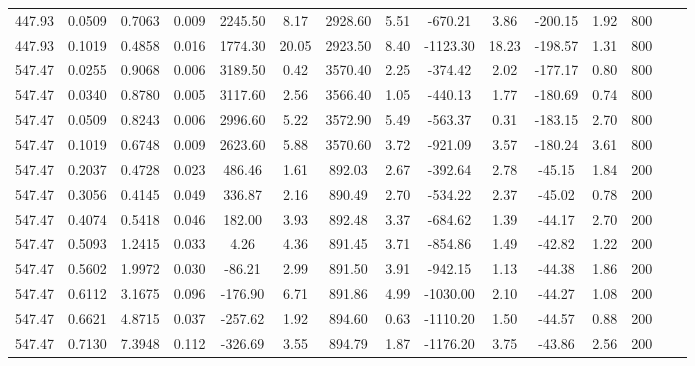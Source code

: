\documentclass[%
 aip,
 jcp,
 sd,%
 amsmath,amssymb,
]{revtex4-1}
\begin{document}
\begin{table*}[!htbp]
\begin{ruledtabular}
\begin{tabular}{ccccccccccccccc}
447.93	&	0.0509	&	0.7063	&	0.009	&	2245.50	&	8.17	&	2928.60	&	5.51	&	-670.21	&	3.86	&	-200.15	&	1.92	&	800	\\
447.93	&	0.1019	&	0.4858	&	0.016	&	1774.30	&	20.05	&	2923.50	&	8.40	&	-1123.30	&	18.23	&	-198.57	&	1.31	&	800	\\
547.47	&	0.0255	&	0.9068	&	0.006	&	3189.50	&	0.42	&	3570.40	&	2.25	&	-374.42	&	2.02	&	-177.17	&	0.80	&	800	\\
547.47	&	0.0340	&	0.8780	&	0.005	&	3117.60	&	2.56	&	3566.40	&	1.05	&	-440.13	&	1.77	&	-180.69	&	0.74	&	800	\\
547.47	&	0.0509	&	0.8243	&	0.006	&	2996.60	&	5.22	&	3572.90	&	5.49	&	-563.37	&	0.31	&	-183.15	&	2.70	&	800	\\
547.47	&	0.1019	&	0.6748	&	0.009	&	2623.60	&	5.88	&	3570.60	&	3.72	&	-921.09	&	3.57	&	-180.24	&	3.61	&	800	\\
547.47	&	0.2037	&	0.4728	&	0.023	&	486.46	&	1.61	&	892.03	&	2.67	&	-392.64	&	2.78	&	-45.15	&	1.84	&	200	\\
547.47	&	0.3056	&	0.4145	&	0.049	&	336.87	&	2.16	&	890.49	&	2.70	&	-534.22	&	2.37	&	-45.02	&	0.78	&	200	\\
547.47	&	0.4074	&	0.5418	&	0.046	&	182.00	&	3.93	&	892.48	&	3.37	&	-684.62	&	1.39	&	-44.17	&	2.70	&	200	\\
547.47	&	0.5093	&	1.2415	&	0.033	&	4.26	&	4.36	&	891.45	&	3.71	&	-854.86	&	1.49	&	-42.82	&	1.22	&	200	\\
547.47	&	0.5602	&	1.9972	&	0.030	&	-86.21	&	2.99	&	891.50	&	3.91	&	-942.15	&	1.13	&	-44.38	&	1.86	&	200	\\
547.47	&	0.6112	&	3.1675	&	0.096	&	-176.90	&	6.71	&	891.86	&	4.99	&	-1030.00	&	2.10	&	-44.27	&	1.08	&	200	\\
547.47	&	0.6621	&	4.8715	&	0.037	&	-257.62	&	1.92	&	894.60	&	0.63	&	-1110.20	&	1.50	&	-44.57	&	0.88	&	200	\\
547.47	&	0.7130	&	7.3948	&	0.112	&	-326.69	&	3.55	&	894.79	&	1.87	&	-1176.20	&	3.75	&	-43.86	&	2.56	&	200	\\
\end{tabular}
\end{ruledtabular}
\end{table*}
\end{document}
